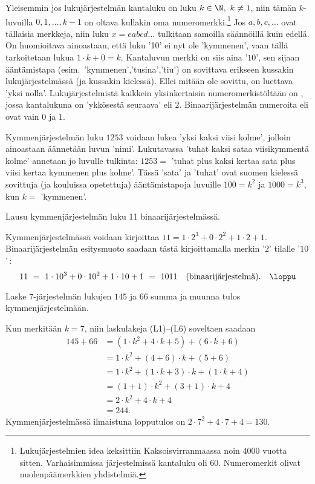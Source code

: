 Yleisemmin jos lukujärjestelmän kantaluku on luku $k \in \N,\ k\neq 1$, niin tämän 
$k$- luvuilla $0,1, \ldots, k-1$ on oltava kullakin oma 
numeromerkki.\footnote[2]{Lukujärjestelmien idea keksittiin Kaksoisvirranmaassa noin 4000 vuotta
sitten. Varhaisimmissa järjestelmissä kantaluku oli $60$. Numeromerkit olivat nuolenpäämerkkien
yhdistelmiä.} Jos $a,b,c, \ldots$ ovat tällaisia merkkeja, niin luku $x = eabcd \ldots$ 
tulkitaan samoilla säännöillä kuin edellä. On huomioitava ainoastaan, että luku '10' ei nyt ole
'kymmenen', vaan tällä tarkoitetaan lukua $1\cdot k + 0 = k$. Kantaluvun merkki on siis aina 
'$10$', sen sijaan ääntämistapa (esim.\ 'kymmenen','tusina','tiu') on sovittava erikseen 
kussakin lukujärjestelmässä (ja kussakin kielessä). Ellei mitään ole sovittu, on luettava 
'yksi nolla'. Lukujärjestelmistä kaikkein yksinkertaisin numeromerkistöltään on 
%
, jossa kantalukuna on 'ykkösestä seuraava' eli $2$. Binaarijärjestelmän
%
numeroita eli  ovat vain $0$ ja $1$.
\begin{Exa} Kymmenjärjestelmän luku $1253$ voidaan lukea 'yksi kaksi viisi kolme', jolloin 
ainoastaan äännetään luvun 'nimi'. Lukutavassa 'tuhat kaksi sataa viisikymmentä kolme' annetaan
jo luvulle tulkinta: $1253 = $ 'tuhat plus kaksi kertaa sata plus viisi kertaa kymmenen plus 
kolme'. Tässä 'sata' ja 'tuhat' ovat suomen kielessä sovittuja (ja kouluissa opetettuja) 
ääntämistapoja luvuille $100=k^2$ ja $1000=k^3$, kun $k =$ 'kymmenen'. \loppu 
\end{Exa}
\begin{Exa} Lausu kymmenjärjestelmän luku 11 binaarijärjestelmässä. \end{Exa}
\ratk Kymmenjärjestelmässä voidaan kirjoittaa $11 = 1 \cdot 2^3 + 0 \cdot 2^2 + 1 \cdot 2 + 1$. 
Binaarijärjestelmän esitysmuoto saadaan tästä kirjoittamalla merkin '$2$' tilalle '$10$'\,:
\[
11\ =\ 1 \cdot 10^3 + 0 \cdot 10^2 + 1 \cdot 10 + 1\ =\ 1011 \quad 
                                  \text{(binaarijärjestelmä)}. \quad \loppu
\]
\begin{Exa} Laske $7$-järjestelmän lukujen $145$ ja $66$ summa ja muunna tulos 
kymmenjärjestelmään. \end{Exa}
\ratk Kun merkitään $k=7$, niin laskulakeja (L1)--(L6) soveltaen saadaan
\begin{align*}
145+66 &= (1 \cdot k^2 + 4 \cdot k + 5) + (6 \cdot k + 6) \\
       &= 1 \cdot k^2 + (4+6) \cdot k + (5+6) \\
       &= 1 \cdot k^2 + (1 \cdot k + 3) \cdot k + (1 \cdot k + 4) \\
       &= (1+1) \cdot k^2 + (3+1) \cdot k + 4 \\
       &= 2 \cdot k^2 + 4 \cdot k + 4 \\
       &= 244.
\end{align*}
Kymmenjärjestelmässä ilmaistuna lopputulos on $2 \cdot 7^2 + 4 \cdot 7 + 4 = 130$. \loppu

